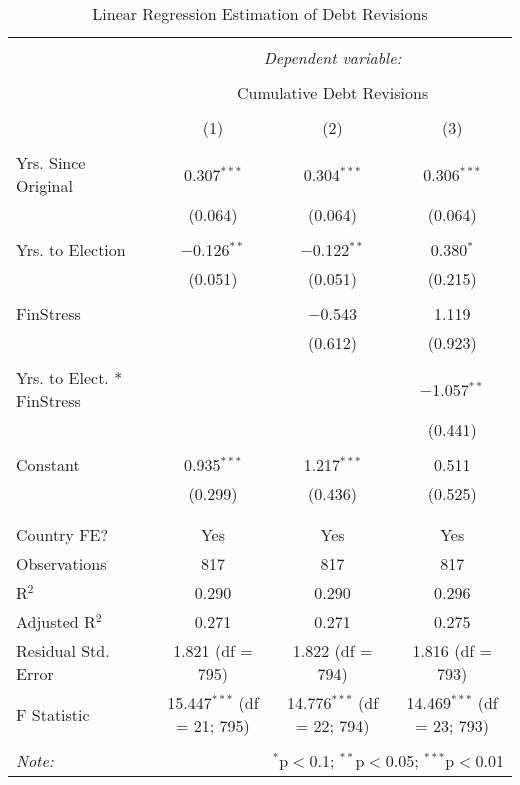 
\begin{table}[!htbp] \centering 
  \caption{Linear Regression Estimation of Debt Revisions} 
  \label{debt_results} 
\footnotesize 
\begin{tabular}{@{\extracolsep{5pt}}lccc} 
\\[-1.8ex]\hline 
\hline \\[-1.8ex] 
 & \multicolumn{3}{c}{\textit{Dependent variable:}} \\ 
\cline{2-4} 
\\[-1.8ex] & \multicolumn{3}{c}{Cumulative Debt Revisions} \\ 
\\[-1.8ex] & (1) & (2) & (3)\\ 
\hline \\[-1.8ex] 
 Yrs. Since Original & 0.307$^{***}$ & 0.304$^{***}$ & 0.306$^{***}$ \\ 
  & (0.064) & (0.064) & (0.064) \\ 
  & & & \\ 
 Yrs. to Election & $-$0.126$^{**}$ & $-$0.122$^{**}$ & 0.380$^{*}$ \\ 
  & (0.051) & (0.051) & (0.215) \\ 
  & & & \\ 
 FinStress &  & $-$0.543 & 1.119 \\ 
  &  & (0.612) & (0.923) \\ 
  & & & \\ 
 Yrs. to Elect. * FinStress &  &  & $-$1.057$^{**}$ \\ 
  &  &  & (0.441) \\ 
  & & & \\ 
 Constant & 0.935$^{***}$ & 1.217$^{***}$ & 0.511 \\ 
  & (0.299) & (0.436) & (0.525) \\ 
  & & & \\ 
\hline \\[-1.8ex] 
Country FE? & Yes & Yes & Yes \\ 
Observations & 817 & 817 & 817 \\ 
R$^{2}$ & 0.290 & 0.290 & 0.296 \\ 
Adjusted R$^{2}$ & 0.271 & 0.271 & 0.275 \\ 
Residual Std. Error & 1.821 (df = 795) & 1.822 (df = 794) & 1.816 (df = 793) \\ 
F Statistic & 15.447$^{***}$ (df = 21; 795) & 14.776$^{***}$ (df = 22; 794) & 14.469$^{***}$ (df = 23; 793) \\ 
\hline 
\hline \\[-1.8ex] 
\textit{Note:}  & \multicolumn{3}{r}{$^{*}$p$<$0.1; $^{**}$p$<$0.05; $^{***}$p$<$0.01} \\ 
\end{tabular} 
\end{table} 
